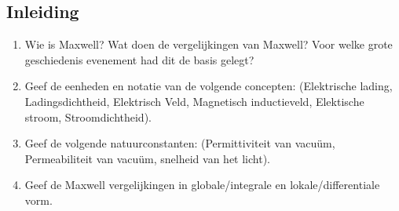 \documentclass[a4paper,12pt]{article}
\begin{document}
    \subsection{Inleiding}
    \begin{enumerate}
        \item Wie is Maxwell? Wat doen de vergelijkingen van Maxwell? Voor welke grote geschiedenis evenement had dit de basis gelegt?
        \item Geef de eenheden en notatie van de volgende concepten: (Elektrische lading, Ladingsdichtheid, Elektrisch Veld, Magnetisch inductieveld, Elektische stroom, Stroomdichtheid).
        \item Geef de volgende natuurconstanten: (Permittiviteit van vacuüm, Permeabiliteit van vacuüm, snelheid van het licht).
        \item Geef de Maxwell vergelijkingen in globale/integrale en lokale/differentiale vorm.
    \end{enumerate}
\end{document}
